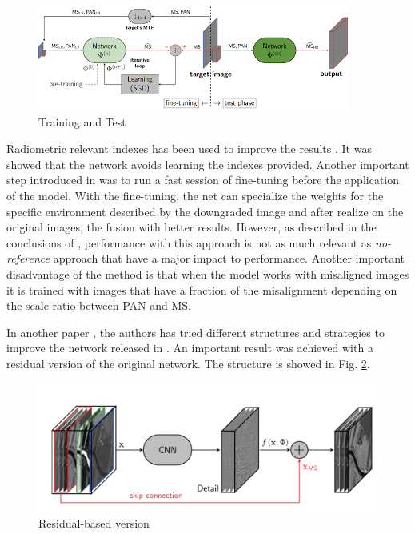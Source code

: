 \documentclass[12pt]{report}
\begin{document}
\begin{figure}[t]
    \centering
    \includegraphics[scale=.9]{pnn-training.png}
    \caption{Training and Test\cite{pnn2}}
    \label{fig:pnn-training}
\end{figure}

Radiometric relevant indexes has been used to improve the results \cite{pnn}. 
It was showed that the network avoids learning the indexes provided.
Another important step introduced in \cite{pnn2} was to run a fast session of fine-tuning before the 
application of the model.
With the fine-tuning, the net can specialize the weights for the specific environment described by the downgraded image
and after realize on the original images, the fusion with better results.
However, as described in the conclusions of \cite{pnn2}, performance with this approach is
not as much relevant as \textit{no-reference} approach that have a major impact to performance.
Another important disadvantage of the method is that when the model works with misaligned images 
it is trained with images that have a fraction of the misalignment depending on the scale ratio between PAN and MS. 

In another paper \cite{residualpnn}, the authors has tried different structures and strategies to improve the network released in \cite{pnn}.
An important result was achieved with a residual version of the original network.
The structure is showed in Fig. \ref{fig:residual-architecture}.

\begin{figure}[t]
    \centering
    \includegraphics[scale=.35]{residualpnn-architecture.png}
    \caption{Residual-based version \cite{residualpnn}}
    \label{fig:residual-architecture}
\end{figure}
\end{document}
